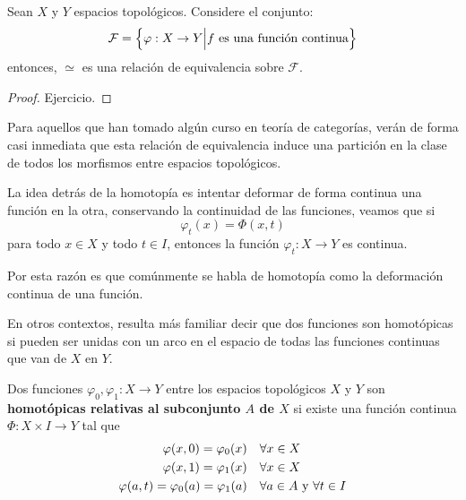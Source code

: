 \documentclass[12pt]{report}
\theoremstyle{largebreak}
\newcommand\cf[3]{\ensuremath{#1:#2\rightarrow#3}}
\begin{document}
    \begin{propo}
        Sean $X$ y $Y$ espacios topológicos. Considere el conjunto:
        \begin{equation*}
            \mathcal{F}=\left\{\cf{\varphi}{X}{Y}\Big|f\textup{ es una función continua} \right\}
        \end{equation*}
        entonces, $\simeq$ es una relación de equivalencia sobre $\mathcal{F}$.
    \end{propo}

    \begin{proof}
        Ejercicio.
    \end{proof}

    \begin{obs}
        Para aquellos que han tomado algún curso en teoría de categorías, verán de forma casi inmediata que esta relación de equivalencia induce una partición en la clase de todos los morfismos entre espacios topológicos.
    \end{obs}

    La idea detrás de la homotopía es intentar deformar de forma continua una función en la otra, conservando la continuidad de las funciones, veamos que si
    \begin{equation*}
        \varphi_t(x)=\Phi(x,t)
    \end{equation*}
    para todo $x\in X$ y todo $t\in I$, entonces la función $\cf{\varphi_t}{X}{Y}$ es continua.

    Por esta razón es que comúnmente se habla de homotopía como la deformación continua de una función.

    \begin{obs}
        En otros contextos, resulta más familiar decir que dos funciones son homotópicas si pueden ser unidas con un arco en el espacio de todas las funciones continuas que van de $X$ en $Y$.
    \end{obs}

    \begin{mydef}
        Dos funciones $\cf{\varphi_0,\varphi_1}{X}{Y}$ entre los espacios topológicos $X$ y $Y$ son \textbf{homotópicas relativas al subconjunto $A$ de $X$} si existe una función continua $\cf{\Phi}{X\times I}{Y}$ tal que
        \begin{equation*}
            \begin{split}
                \varphi(x,0)=\varphi_0(x) & \quad\forall x\in X\\
                \varphi(x,1)=\varphi_1(x) & \quad\forall x\in X\\
                \varphi(a,t)=\varphi_0(a)=\varphi_1(a) & \quad\forall a\in A\textup{ y }\forall t\in I \\
            \end{split}
        \end{equation*}
    \end{mydef}
\end{document}
